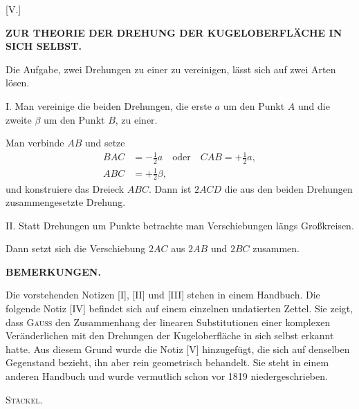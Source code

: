\clearpage
{}
\begin{center}[V.]\end{center}
\begin{center}\bfseries ZUR THEORIE DER DREHUNG DER KUGELOBERFLÄCHE IN SICH SELBST.\end{center}

Die Aufgabe, zwei Drehungen zu einer zu vereinigen, lässt sich auf zwei Arten lösen.

I. Man vereinige die beiden Drehungen, die erste $a$ um den Punkt $A$ und die zweite $\beta$ um den Punkt $B$, zu einer.

\begin{center}
\begin{minipage}{4.4cm}\end{minipage}\hfill
\begin{minipage}{8.1cm}\raggedright
Man verbinde $AB$ und setze
\[
\begin{aligned}
BAC&=-\tfrac12a\quad\text{oder}\quad CAB=+\tfrac12a,\\
ABC&=+\tfrac12\beta,
\end{aligned}
\]
und konstruiere das Dreieck $ABC$. Dann ist $2ACD$ die aus den beiden Drehungen zusammengesetzte Drehung.
\end{minipage}
\end{center}

\begin{center}\end{center}
II. Statt Drehungen um Punkte betrachte man Verschiebungen längs Großkreisen.

Dann setzt sich die Verschiebung $2AC$ aus $2AB$ und $2BC$ zusammen.

\begin{center}\bfseries BEMERKUNGEN.\end{center}

Die vorstehenden Notizen [I], [II] und [III] stehen in einem Handbuch. Die folgende Notiz [IV] befindet sich auf einem einzelnen undatierten Zettel. Sie zeigt, dass \textsc{Gauss} den Zusammenhang der linearen Substitutionen einer komplexen Veränderlichen mit den Drehungen der Kugeloberfläche in sich selbst erkannt hatte. Aus diesem Grund wurde die Notiz [V] hinzugefügt, die sich auf denselben Gegenstand bezieht, ihn aber rein geometrisch behandelt. Sie steht in einem anderen Handbuch und wurde vermutlich schon vor 1819 niedergeschrieben.
\begin{flushright}\textsc{Stäckel.}\end{flushright}
